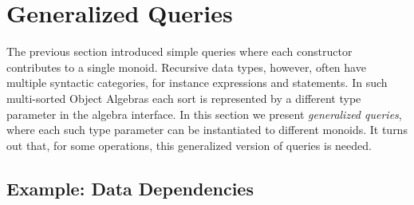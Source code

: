 \section{Generalized Queries}\label{sec:generalizedQueries}

The previous section introduced simple queries where each constructor
contributes to a single monoid.  Recursive data types, however, often
have multiple syntactic categories, for instance expressions and
statements.  In such multi-sorted Object Algebras each sort is
represented by a different type parameter in the algebra interface.
In this section we present \textit{generalized queries}, where each
such type parameter can be instantiated to different monoids.
It turns out that, for some operations, this generalized version
of queries is needed.

\begin{comment}
\haoyuan{General template. Some redundant texts.}
Figure~\ref{gQueryTemplate} shows the general template for \lstinline{Alg<X1, X2, ..., Xn>}.
Note that interface \lstinline{Alg}$_{GQ}$ extends \lstinline{Alg} and declares one monoid for each sort. As we cannot directly join a monoid over one type with a monoid over another type, for every constructor in \lstinline{Alg}$_{GQ}$, the arguments with different types from its return type are ignored.

\begin{figure}[t]
\begin{lstlisting}[mathescape=true]
interface Alg$_{GQ}$<X$_1$,$...$,X$_n$> extends Alg<X$_1$,$...$,X$_n$> {
  Monoid<X$_1$> m$_1$(); $...$; Monoid<X$_n$> m$_n$();

  default X$_i$ f$_j$(X$^1_p$ p$_1$, $...$, X$^k_p$ p$_k$) {
    X$_i$ res = m$_i$().empty();

    /* For all $s$ such that X$^s_p$ = X$_i$. */
    res = m$_i$().join(res, p$_s$);
    $...$
  }
  $...$
}
\end{lstlisting}
\caption{Generic template for generating boilerplate of generalized queries}
\label{gQueryTemplate}
\end{figure}
\end{comment}


\subsection{Example: Data Dependencies}
\label{subsec:depGraph}

